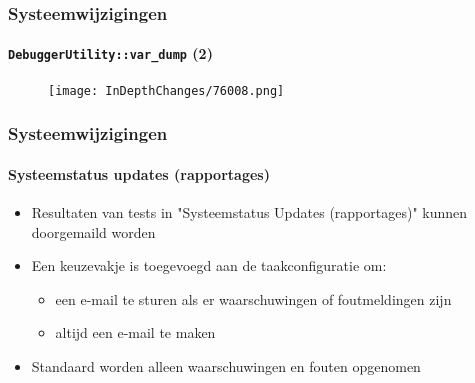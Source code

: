 \begin{frame}[fragile]
	\frametitle{Systeemwijzigingen}
	\framesubtitle{\texttt{DebuggerUtility::var\_dump} (2)}

	\begin{figure}
		\texttt{[image: InDepthChanges/76008.png]}
	\end{figure}

\end{frame}

\begin{frame}[fragile]
	\frametitle{Systeemwijzigingen}
	\framesubtitle{Systeemstatus updates (rapportages)}

	\begin{itemize}
		\item Resultaten van tests in "Systeemstatus Updates (rapportages)" kunnen doorgemaild worden
		\item Een keuzevakje is toegevoegd aan de taakconfiguratie om:

			\begin{itemize}
				\item een e-mail te sturen als er waarschuwingen of foutmeldingen zijn
				\item altijd een e-mail te maken
			\end{itemize}

		\item Standaard worden alleen waarschuwingen en fouten opgenomen

	\end{itemize}

\end{frame}


